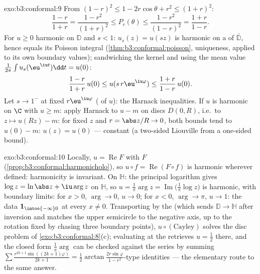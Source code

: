 \begin{solution}{exo:b3:conformal:9}
From $(1-r)^2 \leq 1 - 2r\cos\theta + r^2 \leq (1+r)^2$:
\[
\frac{1-r}{1+r} = \frac{1 - r^2}{(1+r)^2} \leq P_r(\theta)
\leq \frac{1 - r^2}{(1 - r)^2} = \frac{1+r}{1-r} .
\]
For $u \geq 0$ harmonic on $\mathbb D$ and $s < 1$: $u_s(z) =
u(sz)$ is harmonic on a  of $\bar{\mathbb D}$,
hence equals its Poisson integral
(\cref{thm:b3:conformal:poisson}, uniqueness, applied to its
own boundary values); sandwiching the kernel and using the
mean value $\frac1{2\pi}\int u_s(\eu^{\iu t})\dd t = u(0)$:
\[
\frac{1-r}{1+r}\,u(0) \leq u(s\,r\eu^{\iu\varphi}) \leq
\frac{1+r}{1-r}\,u(0).
\]
Let $s \to 1^-$ at fixed $r\eu^{\iu\varphi}$ ( of
$u$): the Harnack inequalities. If $u$ is harmonic on $\C$
with $u \geq m$: apply Harnack to $u - m$ on discs $D(0, R)$,
i.e.\ to $z \mapsto u(Rz) - m$: for fixed $z$ and $r =
\abs z/R \to 0$, both bounds tend to $u(0) - m$: $u(z) =
u(0)$ --- constant (a two-sided Liouville from a one-sided
bound).
\end{solution}

\begin{solution}{exo:b3:conformal:10}
Locally, $u = \operatorname{Re}F$ with $F$ 
(\cref{prop:b3:conformal:harmonicholo}), so $u\circ f =
\operatorname{Re}(F\circ f)$ is harmonic wherever defined:
harmonicity is  invariant. On $\mathbb H$: the
principal logarithm gives $\log z = \ln\abs z + \iu\arg z$
 on $\mathbb H$, so $u = \frac1\pi\arg z =
\operatorname{Im}\bigl(\frac1\pi\log z\bigr)$ is harmonic,
with boundary limits: for $x > 0$, $\arg \to 0$, $u \to 0$;
for $x < 0$, $\arg \to \pi$, $u \to 1$: the data $\mathbf
1_{\intoo{-\infty}0}$ at every $x \neq 0$. Transporting by
the  (which sends $\mathbb D \to \mathbb H$ after
inversion and matches the upper semicircle to the negative
axis, up to the rotation fixed by chasing three boundary
points), $u\circ(\text{Cayley})$ solves the disc problem of
\cref{exo:b3:conformal:8}(c); evaluating at the 
retrieves $u = \frac12$ there, and the closed form
$\frac1\pi\arg$ can be checked against the series by summing
$\sum\frac{r^{2k+1}\sin((2k+1)\varphi)}{2k+1} =
\frac12\arctan\frac{2r\sin\varphi}{1 - r^2}$-type identities
--- the elementary route to the same answer.
\end{solution}


